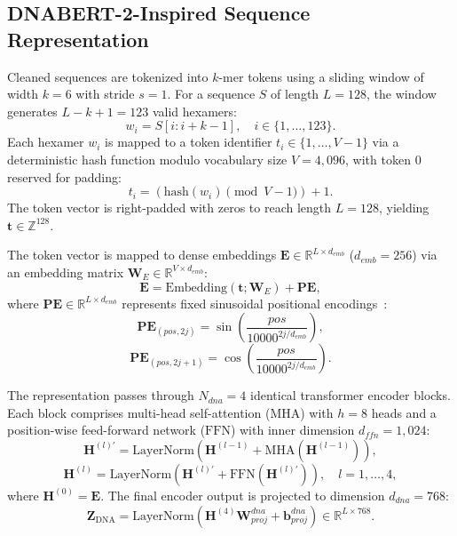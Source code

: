 \documentclass[conference]{IEEEtran}
\begin{document}
\subsection{DNABERT-2-Inspired Sequence Representation}
Cleaned sequences are tokenized into $k$-mer tokens using a sliding window of width $k=6$ with stride $s=1$. For a sequence $S$ of length $L=128$, the window generates $L - k + 1 = 123$ valid hexamers:
\begin{equation}
w_i = S[i : i+k-1], \quad i \in \{1, \dots, 123\}.
\label{eq:kmer}
\end{equation}
Each hexamer $w_i$ is mapped to a token identifier $t_i \in \{1, \dots, V-1\}$ via a deterministic hash function modulo vocabulary size $V = 4,096$, with token $0$ reserved for padding:
\begin{equation}
t_i = (\text{hash}(w_i) \pmod{V - 1}) + 1.
\label{eq:token_hash}
\end{equation}
The token vector is right-padded with zeros to reach length $L=128$, yielding $\mathbf{t} \in \mathbb{Z}^{128}$.

The token vector is mapped to dense embeddings $\mathbf{E} \in \mathbb{R}^{L \times d_{emb}}$ ($d_{emb} = 256$) via an embedding matrix $\mathbf{W}_E \in \mathbb{R}^{V \times d_{emb}}$:
\begin{equation}
\mathbf{E} = \text{Embedding}(\mathbf{t}; \mathbf{W}_E) + \mathbf{PE},
\label{eq:dnabert_emb}
\end{equation}
where $\mathbf{PE} \in \mathbb{R}^{L \times d_{emb}}$ represents fixed sinusoidal positional encodings~\cite{vaswani2017attention}:
\begin{equation}
\mathbf{PE}_{(pos, 2j)} = \sin\left(\frac{pos}{10000^{2j/d_{emb}}}\right),
\label{eq:pe_sin}
\end{equation}
\begin{equation}
\mathbf{PE}_{(pos, 2j+1)} = \cos\left(\frac{pos}{10000^{2j/d_{emb}}}\right).
\label{eq:pe_cos}
\end{equation}

The representation passes through $N_{dna} = 4$ identical transformer encoder blocks. Each block comprises multi-head self-attention ($\text{MHA}$) with $h=8$ heads and a position-wise feed-forward network ($\text{FFN}$) with inner dimension $d_{ffn} = 1,024$:
\begin{equation}
\mathbf{H}^{(l)\prime} = \text{LayerNorm}(\mathbf{H}^{(l-1)} + \text{MHA}(\mathbf{H}^{(l-1)})),
\label{eq:mha_step}
\end{equation}
\begin{equation}
\mathbf{H}^{(l)} = \text{LayerNorm}(\mathbf{H}^{(l)\prime} + \text{FFN}(\mathbf{H}^{(l)\prime})), \quad l = 1, \dots, 4,
\label{eq:ffn_step}
\end{equation}
where $\mathbf{H}^{(0)} = \mathbf{E}$. The final encoder output is projected to dimension $d_{dna} = 768$:
\begin{equation}
\mathbf{Z}_{\text{DNA}} = \text{LayerNorm}(\mathbf{H}^{(4)} \mathbf{W}_{proj}^{dna} + \mathbf{b}_{proj}^{dna}) \in \mathbb{R}^{L \times 768}.
\label{eq:dna_out}
\end{equation}
\end{document}
